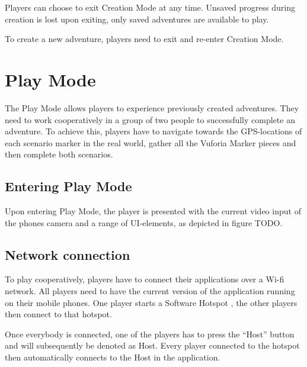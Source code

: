 \documentclass{sigchi-ext}
\begin{document}
Players can choose to exit Creation Mode at any time. Unsaved progress during creation is lost upon exiting, only saved adventures are available to play.

To create a new adventure, players need to exit and re-enter Creation Mode.

\section{Play Mode}
\label{sec:PlayMode}

The Play Mode allows players to experience previously created adventures. They need to work cooperatively in a group of two people to successfully complete an adventure. To achieve this, players have to navigate towards the GPS-locations of each scenario marker in the real world, gather all the Vuforia Marker pieces and then complete both scenarios.

\subsection{Entering Play Mode}

Upon entering Play Mode, the player is presented with the current video input of the phones camera and a range of UI-elements, as depicted in figure TODO.


\subsection{Network connection}

To play cooperatively, players have to connect their applications over a Wi-fi network. All players need to have the current version of the application running on their mobile phones. One player starts a Software Hotspot \cite{desc:hotspot}, the other players then connect to that hotspot.

Once everybody is connected, one of the players has to press the ``Host'' button and will subsequently be denoted as Host. Every player connected to the hotspot then automatically connects to the Host in the application. 
\end{document}
